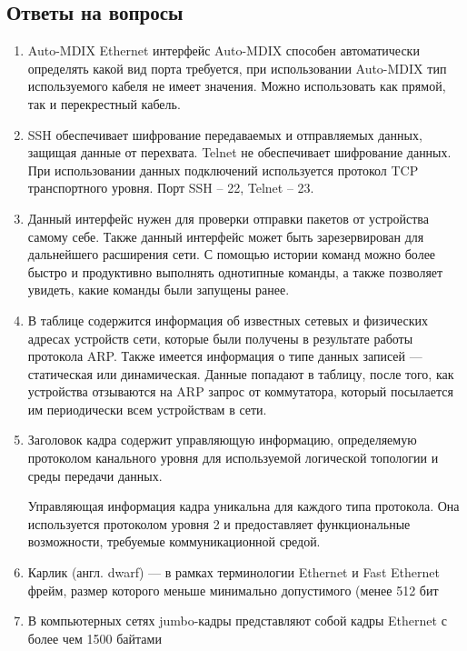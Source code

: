 \documentclass[a4paper,14pt]{extarticle}
\begin{document}
\subsection*{Ответы на вопросы}
\begin{enumerate}
	\item Auto-MDIX
	Ethernet интерфейс Auto-MDIX способен автоматически определять какой вид порта требуется, при использовании Auto-MDIX тип используемого кабеля не имеет значения. Можно использовать как прямой, так и перекрестный кабель.
	
	\item SSH обеспечивает шифрование передаваемых и отправляемых данных, защищая данные от перехвата. Telnet не обеспечивает шифрование данных. При использовании данных подключений используется протокол TCP транспортного уровня. Порт SSH -- 22, Telnet -- 23.
	\item Данный интерфейс нужен для проверки отправки пакетов от устройства самому себе. Также данный интерфейс может быть зарезервирован для дальнейшего расширения сети. С помощью истории команд можно более быстро и продуктивно выполнять однотипные команды, а также позволяет увидеть, какие команды были запущены ранее. 
	\item В таблице содержится информация об известных сетевых и физических адресах устройств сети, которые были получены в результате работы протокола ARP. Также имеется информация о типе данных записей --- статическая или динамическая. Данные попадают в таблицу, после того, как устройства отзываются на ARP запрос от коммутатора, который посылается им периодически всем устройствам в сети.
	\item Заголовок кадра содержит управляющую информацию, определяемую протоколом канального уровня для используемой логической топологии и среды передачи данных.
	
	Управляющая информация кадра уникальна для каждого типа протокола. Она используется протоколом уровня 2 и предоставляет функциональные возможности, требуемые коммуникационной средой.
	\item Карлик (англ. dwarf) — в рамках терминологии Ethernet и Fast Ethernet фрейм, размер которого меньше минимально допустимого (менее 512 бит
	\item В компьютерных сетях jumbo-кадры представляют собой кадры Ethernet с более чем 1500 байтами
\end{enumerate}
\end{document}
